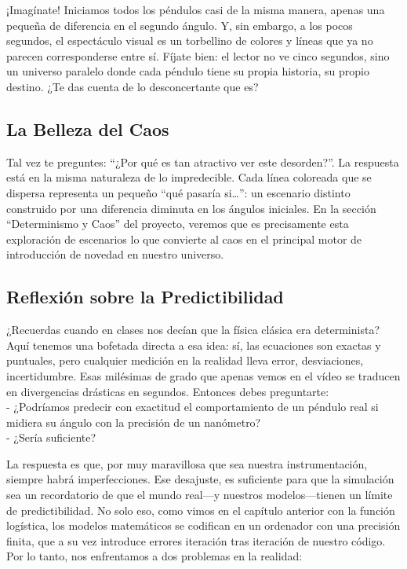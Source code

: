 \documentclass[
  10pt,
  a4paper,
  DIV=11,
  numbers=noendperiod,
  open=any]{scrreprt}
\numberwithin{equation}{chapter}
\numberwithin{equation}{section}
\renewcommand{\[}{\begin{equation}}
\renewcommand{\]}{\end{equation}}
\begin{document}
¡Imagínate! Iniciamos todos los péndulos casi de la misma manera, apenas
una pequeña de diferencia en el segundo ángulo. Y, sin embargo, a los
pocos segundos, el espectáculo visual es un torbellino de colores y
líneas que ya no parecen corresponderse entre sí. Fíjate bien: el lector
no ve cinco segundos, sino un universo paralelo donde cada péndulo tiene
su propia historia, su propio destino. ¿Te das cuenta de lo
desconcertante que es?

\subsection{La Belleza del Caos}\label{la-belleza-del-caos}

Tal vez te preguntes: ``¿Por qué es tan atractivo ver este desorden?''.
La respuesta está en la misma naturaleza de lo impredecible. Cada línea
coloreada que se dispersa representa un pequeño ``qué pasaría
si\ldots{}'': un escenario distinto construido por una diferencia
diminuta en los ángulos iniciales. En la sección ``Determinismo y Caos''
del proyecto, veremos que es precisamente esta exploración de escenarios
lo que convierte al caos en el principal motor de introducción de
novedad en nuestro universo.

\subsection{Reflexión sobre la
Predictibilidad}\label{reflexiuxf3n-sobre-la-predictibilidad}

¿Recuerdas cuando en clases nos decían que la física clásica era
determinista? Aquí tenemos una bofetada directa a esa idea: sí, las
ecuaciones son exactas y puntuales, pero cualquier medición en la
realidad lleva error, desviaciones, incertidumbre. Esas milésimas de
grado que apenas vemos en el vídeo se traducen en divergencias drásticas
en segundos. Entonces debes preguntarte:\\
- ¿Podríamos predecir con exactitud el comportamiento de un péndulo real
si midiera su ángulo con la precisión de un nanómetro?\\
- ¿Sería suficiente?

La respuesta es que, por muy maravillosa que sea nuestra
instrumentación, siempre habrá imperfecciones. Ese desajuste, es
suficiente para que la simulación sea un recordatorio de que el mundo
real---y nuestros modelos---tienen un límite de predictibilidad. No solo
eso, como vimos en el capítulo anterior con la función logística, los
modelos matemáticos se codifican en un ordenador con una precisión
finita, que a su vez introduce errores iteración tras iteración de
nuestro código. Por lo tanto, nos enfrentamos a dos problemas en la
realidad:
\end{document}
